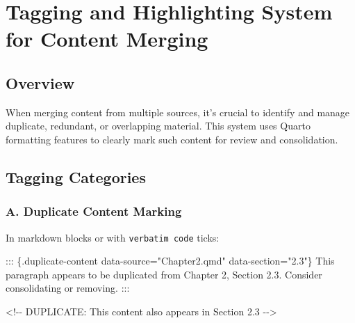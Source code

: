 \documentclass[
  11pt,
  letterpaper,
]{book}
\newenvironment{Shaded}{\begin{snugshade}}{\end{snugshade}}
\newcommand{\InformationTok}[1]{\textcolor[rgb]{0.37,0.37,0.37}{#1}}
\newcommand{\NormalTok}[1]{\textcolor[rgb]{0.00,0.23,0.31}{#1}}
\begin{document}

\chapter*{Tagging and Highlighting System for Content
Merging}\label{tagging-and-highlighting-system-for-content-merging}


\section*{Overview}\label{overview-1}


When merging content from multiple sources, it's crucial to identify and
manage duplicate, redundant, or overlapping material. This system uses
Quarto formatting features to clearly mark such content for review and
consolidation.

\section*{Tagging Categories}\label{tagging-categories}


\subsection*{A. Duplicate Content
Marking}\label{a.-duplicate-content-marking}

In markdown blocks or with \texttt{verbatim\ code} ticks:

\begin{Shaded}
\begin{Highlighting}[]
\NormalTok{::: \{.duplicate{-}content data{-}source="Chapter2.qmd" data{-}section="2.3"\}}
\NormalTok{This paragraph appears to be duplicated from Chapter 2, Section 2.3.}
\NormalTok{Consider consolidating or removing.}
\NormalTok{:::}

\InformationTok{\textasciigrave{}\textless{}!{-}{-} DUPLICATE: This content also appears in Section 2.3 {-}{-}\textgreater{}\textasciigrave{}}
\end{Highlighting}
\end{Shaded}
\end{document}

